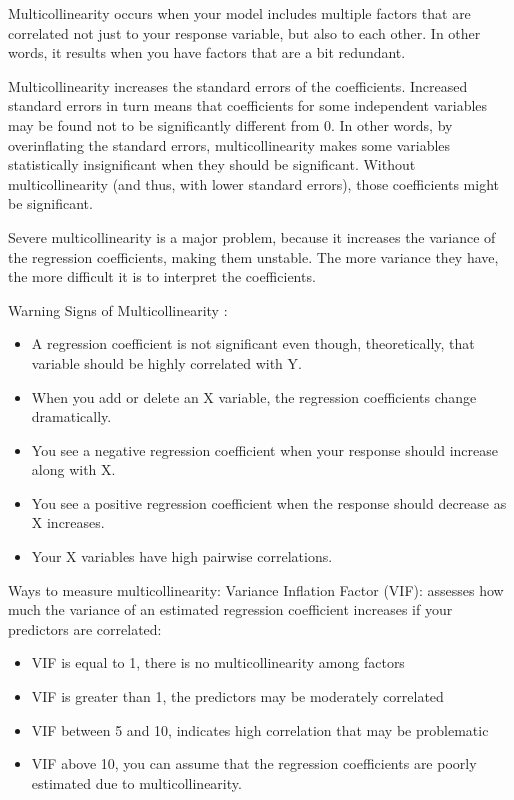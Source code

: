 \documentclass[
]{book}
\begin{document}
\begin{description}
Multicollinearity occurs when your model includes multiple factors that are correlated not just to your response variable, but also to each other. In other words, it results when you have factors that are a bit redundant.

Multicollinearity increases the standard errors of the coefficients. Increased standard errors in turn means that coefficients for some independent variables may be found not to be significantly different from 0. In other words, by overinflating the standard errors, multicollinearity makes some variables statistically insignificant when they should be significant. Without multicollinearity (and thus, with lower standard errors), those coefficients might be significant.

Severe multicollinearity is a major problem, because it increases the variance of the regression coefficients, making them unstable. The more variance they have, the more difficult it is to interpret the coefficients.

Warning Signs of Multicollinearity :

\begin{itemize}
\item
  A regression coefficient is not significant even though, theoretically, that variable should be highly correlated with Y.
\item
  When you add or delete an X variable, the regression coefficients change dramatically.
\item
  You see a negative regression coefficient when your response should increase along with X.
\item
  You see a positive regression coefficient when the response should decrease as X increases.
\item
  Your X variables have high pairwise correlations.
\end{itemize}

Ways to measure multicollinearity: Variance Inflation Factor (VIF): assesses how much the variance of an estimated regression coefficient increases if your predictors are correlated:

\begin{itemize}
\item
  VIF is equal to 1, there is no multicollinearity among factors
\item
  VIF is greater than 1, the predictors may be moderately correlated
\item
  VIF between 5 and 10, indicates high correlation that may be problematic
\item
  VIF above 10, you can assume that the regression coefficients are poorly estimated due to multicollinearity.
\end{itemize}


\end{description}
\end{document}
